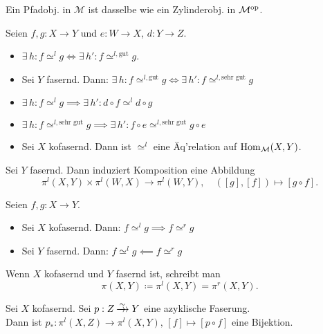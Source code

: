 \documentclass{cheat-sheet}
\newcommand{\nspace}[1]{\foreach \i in {1,...,#1}{ \! }} %
\newcommand{\xtwoheadrightarrow}[1]{\xrightarrow{#1}\nspace{8}\to\,\,} %
\newcommand{\gut}{\text{gut}}
\newcommand{\sg}{\text{sehr gut}}
\newcommand{\ModC}{\mathcal{M}} %
\begin{document}
\begin{bem}
  Ein Pfadobj. in $\ModC$ ist dasselbe wie ein Zylinderobj. in $\ModC^\op$.
\end{bem}


\begin{lem}
  Seien $f, g : X \to Y$ und $e : W \to X$, $d : Y \to Z$.
  \begin{itemize}
    \item $\exists \, h : f \simeq^l g \iff \exists \, h' : f \simeq^{l,\gut} g$.
    \item Sei $Y$ fasernd. Dann: $\exists \, h : f \simeq^{l,\gut} g \iff \exists \, h' : f \simeq^{l,\sg} g$
    \item $\exists \, h : f \simeq^l g \implies \exists \, h' : d \circ f \simeq^l d \circ g$
    \item $\exists \, h : f \simeq^{l,\sg} g \implies \exists \, h' : f \circ e \simeq^{l,\sg} g \circ e$
    \item Sei $X$ kofasernd. Dann ist $\simeq^l$ eine Äq'relation auf $\Hom_\ModC(X, Y)$.
  \end{itemize}
\end{lem}

\begin{kor}
  Sei $Y$ fasernd. Dann induziert Komposition eine Abbildung
  \[
    \pi^l(X, Y) \times \pi^l(W, X) \to \pi^l(W, Y), \quad
    ([g], [f]) \mapsto [g \circ f].
  \]
\end{kor}

\begin{prop}
  Seien $f, g : X \to Y$.
  \begin{itemize}
    \item Sei $X$ kofasernd. Dann: $f \simeq^l g \implies f \simeq^r g$
    \item Sei $Y$ fasernd.\phantom{ko} Dann: $f \simeq^l g \impliedby f \simeq^r g$
  \end{itemize}
\end{prop}

\begin{nota}
  Wenn $X$ kofasernd und $Y$ fasernd ist, schreibt man
  \[ \pi(X, Y) \coloneqq \pi^l(X, Y) = \pi^r(X, Y). \]
\end{nota}

\begin{thm}
  Sei $X$ kofasernd. Sei $p : Z \xtwoheadrightarrow{\sim} Y$ eine azyklische Faserung. \\
  Dann ist $p_* : \pi^l(X, Z) \to \pi^l(X, Y), \, [f] \mapsto [p \circ f]$ eine Bijektion.
\end{thm}
\end{document}
